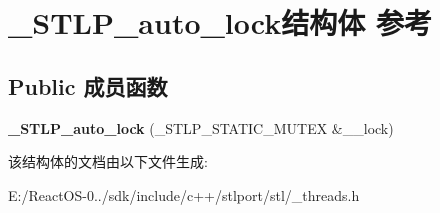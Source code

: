 \hypertarget{struct___s_t_l_p__auto__lock}{}\section{\+\_\+\+S\+T\+L\+P\+\_\+auto\+\_\+lock结构体 参考}
\label{struct___s_t_l_p__auto__lock}
\subsection*{Public 成员函数}
\begin{DoxyCompactItemize}
\item 
\mbox{\label{struct___s_t_l_p__auto__lock_a633ea3fade55bde4cc6bd1b5ed59a4e0}} 
{\bfseries \+\_\+\+S\+T\+L\+P\+\_\+auto\+\_\+lock} (\+\_\+\+S\+T\+L\+P\+\_\+\+S\+T\+A\+T\+I\+C\+\_\+\+M\+U\+T\+EX \&\+\_\+\+\_\+lock)
\end{DoxyCompactItemize}


该结构体的文档由以下文件生成\+:\begin{DoxyCompactItemize}
\item 
E\+:/\+React\+O\+S-\/0../sdk/include/c++/stlport/stl/\+\_\+threads.\+h\end{DoxyCompactItemize}
